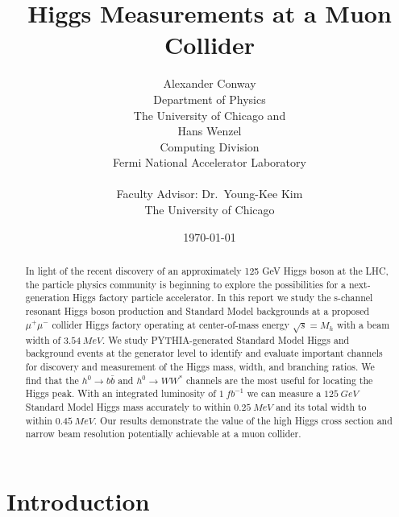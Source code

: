 \documentclass[a4paper]{article}
\title{Higgs Measurements at a Muon Collider}
\author{
	Alexander Conway \\
	Department of Physics\\
	The University of Chicago
	and\\
	Hans Wenzel\\
	Computing Division\\
	Fermi National Accelerator Laboratory\\
	\\
	Faculty Advisor: Dr.\ Young-Kee Kim\\
	The University of Chicago}
\date{\today}
\begin{document}
\maketitle

\begin{abstract}
	In light of the recent discovery of an approximately 125 GeV Higgs boson at the LHC, the particle physics community is beginning to explore the possibilities for a next-generation Higgs factory particle accelerator. In this report we study the s-channel resonant Higgs boson production and Standard Model backgrounds at a proposed $\mu^+\mu^-$ collider Higgs factory operating at center-of-mass energy $\sqrt{s} = M_h$ with a beam width of $3.54~MeV$. We study PYTHIA-generated Standard Model Higgs and background events at the generator level to identify and evaluate important channels for discovery and measurement of the Higgs mass, width, and branching ratios. We find that the $h^0\rightarrow b\bar{b}$ and $h^0\rightarrow WW^*$ channels are the most useful for locating the Higgs peak. With an integrated luminosity of $1\ fb^{-1}$ we can measure a $125~GeV$ Standard Model Higgs mass accurately to within $0.25~MeV$ and its total width to within $0.45~MeV$. Our results demonstrate the value of the high Higgs cross section and narrow beam resolution potentially achievable at a muon collider.
\end{abstract}

\tableofcontents

\section{Introduction}
\end{document}
